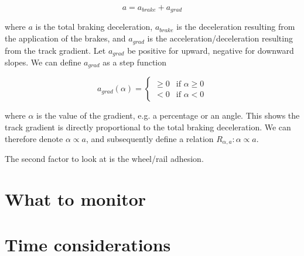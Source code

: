 \begin{equation}
\label{eq:deceleration}
a = a_{brake} + a_{grad}
\end{equation}

\noindent
where $a$ is the total braking deceleration, $a_{brake}$ is the deceleration resulting from the application of the brakes, and $a_{grad}$ is the acceleration/deceleration resulting from the track gradient. Let $a_{grad}$ be positive for upward, negative for downward slopes. We can define $a_{grad}$ as a step function

\begin{equation}
\label{eq:gradientdeceleration}
a_{grad}(\alpha) =
\begin{cases}
\geq 0 & \text{if $\alpha \geq 0$} \\
< 0 & \text{if $\alpha < 0$}
\end{cases}
\end{equation}

\noindent
where $\alpha$ is the value of the gradient, e.g. a percentage or an angle. This shows the track gradient is directly proportional to the total braking deceleration. We can therefore denote $\alpha \propto a$, and subsequently define a relation $R_{\alpha,a}: \alpha \propto a$.
\par
The second factor to look at is the wheel/rail adhesion.  

\bigskip\noindent{}

\section{What to monitor}
\label{sec:Monotoring}
\par\noindent
{}

\section{Time considerations}
\label{sec:TimeConsiderations}
\par\noindent
{}